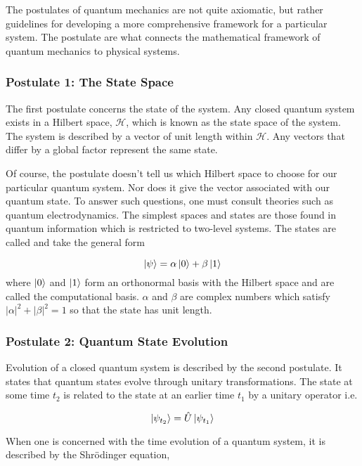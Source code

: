 The postulates of quantum mechanics are not quite axiomatic, but rather guidelines for developing a more comprehensive framework for a particular system. The postulate are what connects the mathematical framework of quantum mechanics to physical systems.

\subsubsection*{Postulate 1: The State Space}

The first postulate concerns the state of the system. Any closed quantum system exists in a Hilbert space, $\mathcal{H}$, which is known as the state space of the system. The system is described by a vector of unit length within $\mathcal{H}$. Any vectors that differ by a global factor represent the same state.

Of course, the postulate doesn't tell us which Hilbert space to choose for our particular quantum system. Nor does it give the vector associated with our quantum state. To answer such questions, one must consult theories such as quantum electrodynamics. The simplest spaces and states are those found in quantum information which is restricted to two-level systems. The states are called  and take the general form

\begin{equation}
	\ket{\psi} = \alpha\ket{0} + \beta\ket{1}
\end{equation} 
where $\ket{0}$ and $\ket{1}$ form an orthonormal basis with the Hilbert space and are called the computational basis. $\alpha$ and $\beta$ are complex numbers which satisfy $|\alpha|^2 + |\beta|^2 = 1$ so that the state has unit length.

\subsubsection*{Postulate 2: Quantum State Evolution}

Evolution of a closed quantum system is described by the second postulate. It states that quantum states evolve through unitary transformations. The state at some time $t_2$ is related to the state at an earlier time $t_1$ by a unitary operator i.e.

\begin{equation}
	\ket{\psi_{t_2}} = \hat{U}\ket{\psi_{t_1}}
\end{equation}

When one is concerned with the time evolution of a quantum system, it is described by the Shr\"{o}dinger equation,

